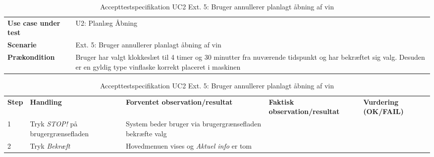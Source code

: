 \begin{table}[H]
	\centering
	\caption{Accepttestspecifikation UC2 Ext. 5: Bruger annullerer planlagt åbning af vin}
	\label{ATUC2:Ext2}
	\begin{tabular}{ p{80pt}  p{320pt} }\hline
		\rowcolor{lightgray}	
		\textbf{Use case under test} & U2: Planlæg Åbning \\
		\rowcolor{white}
		\textbf{Scenarie} & Ext. 5: Bruger annullerer planlagt åbning af vin \\\rowcolor{lightgray}	
		\textbf{Prækondition} &
		Bruger har valgt klokkeslæt til 4 timer og 30 minutter fra nuværende tidspunkt og har bekræftet sig valg. Desuden er en gyldig type vinflaske korrekt placeret i maskinen \\
		\hline
	\end{tabular}
	\begin{tabular}{  p{26pt} p{100pt}  p{101pt} | p{67pt} | p{68pt}}
		\textbf{Step} & \textbf{Handling} & \textbf{Forventet observation/resultat} & \textbf{Faktisk observation/resultat} & \textbf{Vurdering (OK/FAIL)}\\
		1 & Tryk \emph{STOP!} på brugergrænsefladen & System beder bruger via brugergrænsefladen bekræfte valg
 &  &  \\
 		2 & Tryk \emph{Bekræft} & Hovedmenuen vises og \emph{Aktuel info} er tom \\
		\hline
	\end{tabular}
\end{table}



